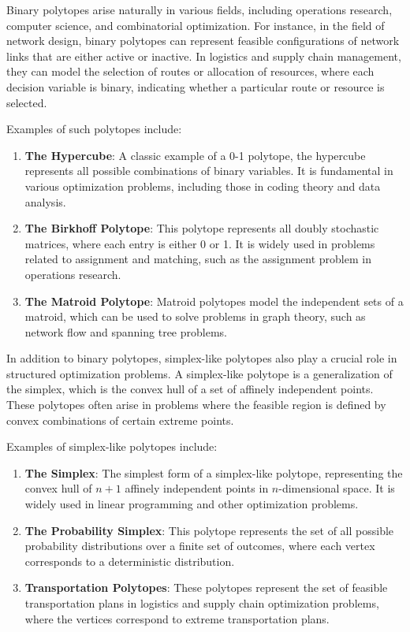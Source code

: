Binary polytopes arise naturally in various fields, including operations research, computer science, and combinatorial optimization. For instance, in the field of network design, binary polytopes can represent feasible configurations of network links that are either active or inactive. In logistics and supply chain management, they can model the selection of routes or allocation of resources, where each decision variable is binary, indicating whether a particular route or resource is selected.

Examples of such polytopes include:
\begin{enumerate}
	\item \textbf{The Hypercube}: A classic example of a 0-1 polytope, the hypercube represents all possible combinations of binary variables. It is fundamental in various optimization problems, including those in coding theory and data analysis.
	\item \textbf{The Birkhoff Polytope}: This polytope represents all doubly stochastic matrices, where each entry is either 0 or 1. It is widely used in problems related to assignment and matching, such as the assignment problem in operations research.
	\item \textbf{The Matroid Polytope}: Matroid polytopes model the independent sets of a matroid, which can be used to solve problems in graph theory, such as network flow and spanning tree problems.
\end{enumerate}

In addition to binary polytopes, simplex-like polytopes also play a crucial role in structured optimization problems. A simplex-like polytope is a generalization of the simplex, which is the convex hull of a set of affinely independent points. These polytopes often arise in problems where the feasible region is defined by convex combinations of certain extreme points.

Examples of simplex-like polytopes include:
\begin{enumerate}
	\item \textbf{The Simplex}: The simplest form of a simplex-like polytope, representing the convex hull of \(n+1\) affinely independent points in \(n\)-dimensional space. It is widely used in linear programming and other optimization problems.
	\item \textbf{The Probability Simplex}: This polytope represents the set of all possible probability distributions over a finite set of outcomes, where each vertex corresponds to a deterministic distribution.
	\item \textbf{Transportation Polytopes}: These polytopes represent the set of feasible transportation plans in logistics and supply chain optimization problems, where the vertices correspond to extreme transportation plans.
\end{enumerate}

